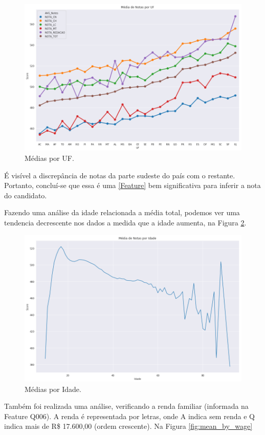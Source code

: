 \documentclass{article}
\begin{document}
\begin{figure}[H]
\centering
  \includegraphics[width= 0.8 \linewidth]{img/mean_by_uf.png}
  \caption{Médias por UF.}
  \label{fig:fig_maq_criad}
\end{figure}

É visível a discrepância de notas da parte sudeste do país com o restante. Portanto, concluí-se que essa é uma \ref{Feature} bem significativa para inferir a nota do candidato.

Fazendo uma análise da idade relacionada a média total, podemos ver uma tendencia decrescente nos dados a medida que a idade aumenta, na Figura \ref{fig:mean_by_age}. 

\begin{figure}[H]
  \includegraphics[width=\linewidth]{img/mean_by_age.png}
  \caption{Médias por Idade.}
  \label{fig:mean_by_age}
\end{figure}

Também foi realizada uma análise, verificando a renda familiar (informada na Feature Q006). A renda é representada por letras, onde A indica sem renda e Q indica mais de R\$ 17.600,00 (ordem crescente). Na Figura \ref{fig:mean_by_wage}
\end{document}
